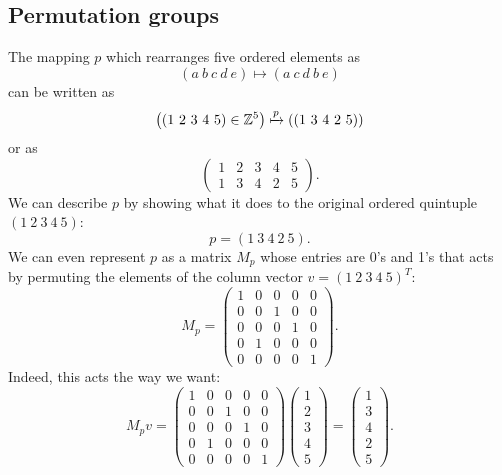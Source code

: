 \documentclass[12 pt]{article}
\newcommand{\Z}{\mathbb{Z}}
\numberwithin{equation}{section}
\begin{document}
\subsection{Permutation groups}
The mapping $p$ which rearranges five ordered elements as \begin{equation*}
(a \ b \ c \ d \ e) \mapsto (a \ c \ d \ b \ e)
\end{equation*}
can be written as \begin{equation*}
\left( (1 \ 2 \ 3 \ 4 \ 5) \in \Z^5 \right) \xmapsto{p} \left( (1 \ 3 \ 4 \ 2 \ 5) \right)
\end{equation*}
or as \begin{equation*}
\begin{pmatrix}
1 & 2 & 3 & 4 & 5 \\
1 & 3 & 4 & 2 & 5
\end{pmatrix}.
\end{equation*}
We can describe $p$ by showing what it does to the original ordered quintuple $(1 \ 2 \ 3 \ 4 \ 5)$:
\begin{equation*}
p = (1 \ 3 \ 4 \ 2 \ 5) .
\end{equation*}
We can even represent $p$ as a matrix $M_p$ whose entries are 0's and 1's that acts by permuting the elements of the column vector $v = (1 \ 2 \ 3 \ 4 \ 5)^T$: \begin{equation*}
M_p = \begin{pmatrix}
1 & 0 & 0 & 0 & 0 \\
0 & 0 & 1 & 0 & 0 \\
0 & 0 & 0 & 1 & 0 \\
0 & 1 & 0 & 0 & 0 \\
0 & 0 & 0 & 0 & 1
\end{pmatrix} .
\end{equation*}
Indeed, this acts the way we want: \begin{equation*}
M_p v = \begin{pmatrix}
1 & 0 & 0 & 0 & 0 \\
0 & 0 & 1 & 0 & 0 \\
0 & 0 & 0 & 1 & 0 \\
0 & 1 & 0 & 0 & 0 \\
0 & 0 & 0 & 0 & 1
\end{pmatrix}
\begin{pmatrix}
1 \\ 2 \\ 3 \\ 4 \\ 5
\end{pmatrix}
=
\begin{pmatrix}
1 \\ 3 \\ 4 \\ 2 \\ 5
\end{pmatrix} .
\end{equation*}
\end{document}
